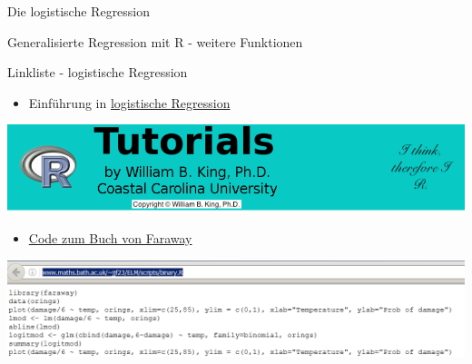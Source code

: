 \documentclass[ignorenonframetext,]{beamer}
\providecommand{\tightlist}{%
\setlength{\itemsep}{0pt}\setlength{\parskip}{0pt}}
\begin{document}
\begin{frame}[fragile]{Die logistische Regression}
\begin{block}{Generalisierte Regression mit R - weitere Funktionen}
\end{block}

\begin{block}{Linkliste - logistische Regression}

\begin{itemize}
\tightlist
\item
  Einführung in
  \href{http://ww2.coastal.edu/kingw/statistics/R-tutorials/logistic.html}{logistische
  Regression}
\end{itemize}

\includegraphics{./tex2pdf.9796/93185dd4bb7c1484371fe0dff58cdcc515faed5f.png}

\begin{itemize}
\tightlist
\item
  \href{http://www.maths.bath.ac.uk/~jjf23/ELM/scripts/binary.R}{Code
  zum Buch von Faraway}
\end{itemize}

\includegraphics{./tex2pdf.9796/0c0890de6fb1b81cbe3195b34d2f26de4789abc9.png}

\end{block}

\end{frame}
\end{document}
